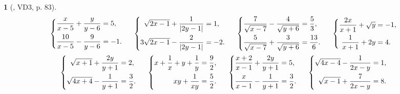 \documentclass{article}
\newtheorem{baitoan}{}
\begin{document}
\begin{baitoan}[\cite{Kien_dai_so_9}, VD3, p. 83]
	\begin{equation*}
		\left\{\begin{split}
			\frac{x}{x - 5} + \frac{y}{y - 6} &= 5,\\
			\frac{10}{x - 5} - \frac{9}{y - 6} &= -1.
		\end{split}\right.\hspace{5mm}\left\{\begin{split}
			\sqrt{2x - 1} + \frac{1}{|2y - 1|} &= 1,\\
			3\sqrt{2x - 1} - \frac{2}{|2y - 1|} &= -2.
		\end{split}\right.\hspace{5mm}\left\{\begin{split}
			\frac{7}{\sqrt{x - 7}} - \frac{4}{\sqrt{y + 6}} &= \frac{5}{3},\\
			\frac{5}{\sqrt{x - 7}} + \frac{3}{\sqrt{y + 6}} &= \frac{13}{6}.
		\end{split}\right.\hspace{5mm}\left\{\begin{split}
			\frac{2x}{x + 1} + \sqrt{y} &= -1,\\
			\frac{1}{x + 1} + 2y &= 4.
		\end{split}\right.
	\end{equation*}
	\begin{equation*}
		\left\{\begin{split}
			\sqrt{x + 1} + \frac{2y}{y + 1} &= 2,\\
			\sqrt{4x + 4} - \frac{1}{y + 1} &= \frac{3}{2}.
		\end{split}\right.\hspace{5mm}\left\{\begin{split}
			x + \frac{1}{x} + y + \frac{1}{y} &= \frac{9}{2},\\
			xy + \frac{1}{xy} &= \frac{5}{2}.
		\end{split}\right.\hspace{5mm}\left\{\begin{split}
			\frac{x + 2}{x - 1} + \frac{2y}{y + 1} &= 5,\\
			\frac{x}{x - 1} - \frac{1}{y + 1} &= \frac{3}{2}.
		\end{split}\right.\hspace{5mm}\left\{\begin{split}
			\sqrt{4x - 4} - \frac{1}{2x - y} &= 1,\\
			\sqrt{x - 1} + \frac{7}{2x - y} &= 8.
		\end{split}\right.
	\end{equation*}	
	
\end{baitoan}
\end{document}
